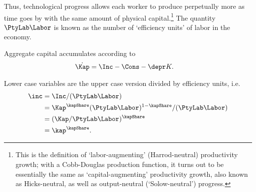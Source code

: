\documentclass{handout}
\begin{document}
Thus, technological progress allows each worker to
produce perpetually more  as time goes by with the same amount of 
physical capital.\footnote{This is the definition of `labor-augmenting' (Harrod-neutral) 
  productivity growth; with a Cobb-Douglas production function, it turns out to be essentially the same as `capital-augmenting' productivity growth, also known as Hicks-neutral, as well as output-neutral (`Solow-neutral') progress.}  The quantity $\PtyLab \Labor$ is known as the number of `efficiency 
units' of labor in the economy.

Aggregate capital accumulates according to
\begin{equation}\begin{gathered}\begin{aligned}
  \dot{\Kap} & =  \Inc - \Cons - \depr K \label{eq:Kdotlevel}.
\end{aligned}\end{gathered}\end{equation}

Lower case variables are the upper case version divided by efficiency units, i.e.
\begin{equation}\begin{gathered}\begin{aligned}
  \inc & =  \Inc/(\PtyLab \Labor)  \\
       & =  \Kap^{\kapShare}(\PtyLab \Labor)^{1-\kapShare}/(\PtyLab \Labor)  \\
       & =  (\Kap/\PtyLab \Labor)^{\kapShare}
  \\   & =  \kap^{\kapShare}    .
\end{aligned}\end{gathered}\end{equation}
\end{document}
